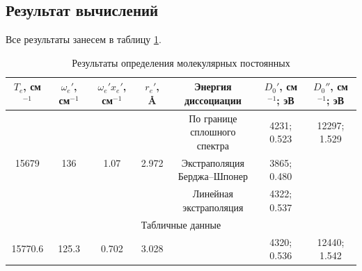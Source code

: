 \subsection{Результат вычислений}
Все результаты занесем в таблицу \ref{table:final_results}.
\begin{table}[h!]
	\centering
	\caption{Результаты определения молекулярных постоянных}
	\begin{tabular}{|c|c|c|c|c|c|c|}
		\hline
		$T_e$, см$^{-1}$ & $\omega_e'$, см$^{-1}$ & $\omega_e'x_e'$, см$^{-1}$ & $r_e'$, \AA & Энергия диссоциации & $D_0'$, см$^{-1}$; эВ & $D_0''$, см$^{-1}$; эВ \bigstrut\\
		\hline
		\multirow{3}[6]{*}{15679} & \multirow{3}[6]{*}{136} & \multirow{3}[6]{*}{1.07} & \multirow{3}[6]{*}{2.972} & \makecell{По границе \\сплошного спектра} & 4231; 0.523 & 12297; 1.529 \bigstrut\\
		\cline{5-7}       &   &   &   & \makecell{Экстраполяция \\Берджа--Шпонер} & 3865; 0.480 &  \bigstrut\\
		\cline{5-7}       &   &   &   & \makecell{Линейная \\экстраполяция} & 4322; 0.537 &  \bigstrut\\
		\hline
		\multicolumn{7}{|c|}{Табличные данные} \bigstrut\\
		\hline
		15770.6& 125.3  & 0.702  &  3.028 &   & 4320; 0.536  & 12440; 1.542 \bigstrut\\
		\hline
		
	\end{tabular}%
	\label{table:final_results}%
\end{table}%

